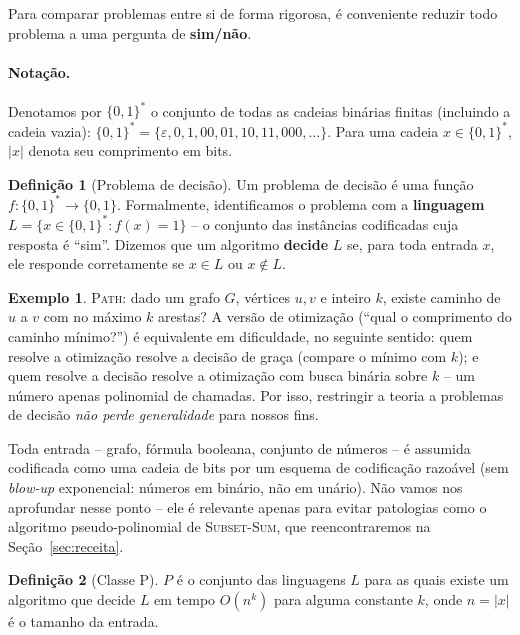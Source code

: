 \documentclass[9pt,a4paper]{extarticle}
\newcommand{\impt}[1]{\textcolor{important}{\textbf{#1}}}
\newcommand{\ntc}[1]{\textcolor{notice}{#1}}
\theoremstyle{definition}
\newtheorem{definition}{Definição}[section]
\newtheorem{example}{Exemplo}[section]
\begin{document}
Para comparar problemas entre si de forma rigorosa, é conveniente reduzir todo problema a uma pergunta de \impt{sim/não}.

\paragraph{Notação.} Denotamos por \(\{0,1\}^*\) o conjunto de todas as \ntc{cadeias binárias finitas} (incluindo a cadeia vazia): \(\{0,1\}^* = \{\varepsilon, 0, 1, 00, 01, 10, 11, 000, \dots\}\). Para uma cadeia \(x \in \{0,1\}^*\), \(|x|\) denota seu comprimento em bits.

\begin{definition}[Problema de decisão]
Um problema de decisão é uma função \(f: \{0,1\}^* \to \{0,1\}\). Formalmente, identificamos o problema com a \impt{linguagem} \(L = \{x \in \{0,1\}^* : f(x) = 1\}\) -- o conjunto das instâncias codificadas cuja resposta é \enquote{sim}. Dizemos que um algoritmo \impt{decide} \(L\) se, para toda entrada \(x\), ele responde corretamente se \(x \in L\) ou \(x \notin L\).
\end{definition}

\begin{example}\label{ex:decisao-otimizacao}
\textsc{Path}: dado um grafo \(G\), vértices \(u,v\) e inteiro \(k\), existe caminho de \(u\) a \(v\) com no máximo \(k\) arestas? A versão de otimização (\enquote{qual o comprimento do caminho mínimo?}) é equivalente em dificuldade, no seguinte sentido: quem resolve a otimização resolve a decisão de graça (compare o mínimo com \(k\)); e quem resolve a decisão resolve a otimização com busca binária sobre \(k\) -- um número apenas polinomial de chamadas. Por isso, restringir a teoria a problemas de decisão \emph{não perde generalidade} para nossos fins.
\end{example}

\ntc{Toda entrada -- grafo, fórmula booleana, conjunto de números -- é assumida codificada como uma cadeia de bits por um esquema de codificação razoável (sem \emph{blow-up} exponencial: números em binário, não em unário). Não vamos nos aprofundar nesse ponto -- ele é relevante apenas para evitar patologias como o algoritmo pseudo-polinomial de \textsc{Subset-Sum}, que reencontraremos na Seção~\ref{sec:receita}.}

\begin{definition}[Classe P]
\(P\) é o conjunto das linguagens \(L\) para as quais existe um algoritmo que decide \(L\) em tempo \(O(n^k)\) para alguma constante \(k\), onde \(n = |x|\) é o tamanho da entrada.
\end{definition}
\end{document}
